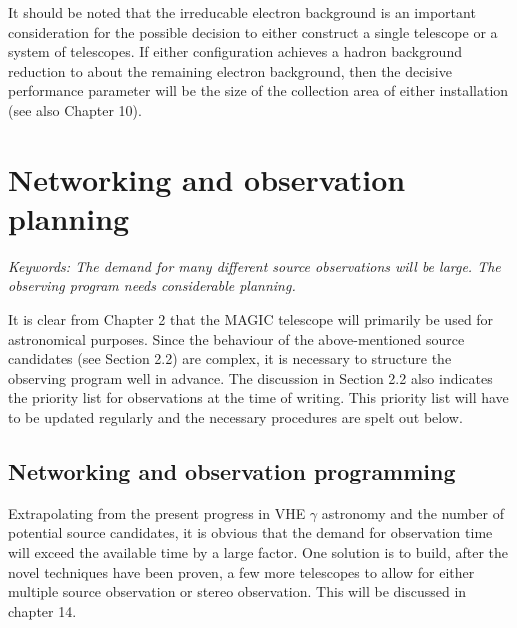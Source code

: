 It should be noted that the irreducable electron background is an important
consideration for the possible decision to either construct a single telescope
or a system of telescopes. If either configuration achieves a hadron background
reduction to about the remaining electron background, then the
decisive performance parameter will be
the size of the collection area of either installation (see also Chapter 10).

\newpage

\hspace{3cm}
\vfill
\newpage
\begin{figure}[t]
\leavevmode
\centering
\epsfxsize=14cm
\end{figure}
\newpage
                      


\setcounter{chapter}{8}

\chapter{Networking and observation planning}

{\it Keywords: The demand for many different source observations will be large.
The observing program needs considerable planning.}

\par\medskip
It is clear from Chapter 2 that the MAGIC telescope will primarily be used for
astronomical purposes. Since the behaviour of the above-mentioned source
candidates (see Section 2.2) are complex, it is necessary to structure the
observing program well in advance. The discussion in Section 2.2 also
indicates the priority list for observations at the time of writing. This
priority list will have to be updated regularly and the necessary procedures
are spelt out below.

\section{Networking and observation programming}

\par\medskip
Extrapolating from the present progress in VHE $\gamma$ astronomy and the
number of potential source candidates, it is obvious that the demand for
observation time will exceed the available time by a large factor. One
solution is to build, after the novel techniques have been proven, a few
more telescopes to allow for either multiple source observation or stereo
observation. This will be discussed in chapter 14.

